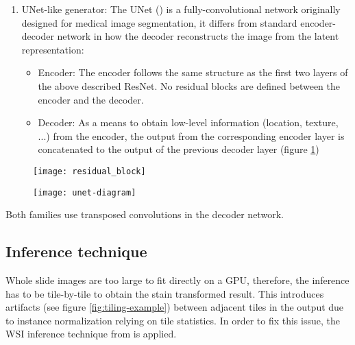 \documentclass[../main.tex]{subfiles}
\begin{document}
\begin{enumerate}
  \item UNet-like generator: The UNet (\cite{Ronneberger2015}) is a
  fully-convolutional network originally designed for medical image segmentation,
  it differs from standard encoder-decoder network in how the decoder
  reconstructs the image from the latent representation:
  \begin{itemize}
  \item Encoder: The encoder follows the same structure as the first two layers
  of the above described ResNet. No residual blocks are defined between the
  encoder and the decoder.
  \item Decoder: As a means to obtain low-level information
  (location, texture, ...) from the encoder,
  the output from the corresponding encoder layer is concatenated to the output
  of the previous decoder layer (figure \ref{fig:unet-diagram})
  \end{itemize}
\end{enumerate}

\begin{figure}[t]
\centering
\begin{minipage}{.5\textwidth}
\centering
\texttt{[image: residual\_block]}
\label{fig:residual-block}
\end{minipage}%
\begin{minipage}{.5\textwidth}
\centering
\texttt{[image: unet-diagram]}
\label{fig:unet-diagram}
\end{minipage}
\end{figure}

Both families use transposed convolutions\footnotemark[\value{footnote}]{}
in the decoder network.


\subsection{Inference technique}\label{sec:inference}
Whole slide images are too large to fit directly on a GPU, therefore,
the inference has to be tile-by-tile to obtain the stain transformed result.
This introduces artifacts (see figure \ref{fig:tiling-example}) between
adjacent tiles in the output due to
instance normalization relying on tile statistics.
In order to fix this issue, the WSI inference technique from \parencite{Bel2019}
is applied.
\end{document}
